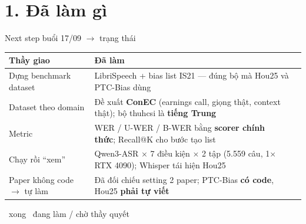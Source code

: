 \documentclass[aspectratio=169,xcolor=table]{beamer}
\newcommand{\hi}[1]{\textcolor{Primary}{\textbf{#1}}}
\newcommand{\bad}[1]{\textcolor{RiskRed}{\textbf{#1}}}
\newcommand{\cmark}{\textcolor{GoodGreen}{\ding{51}}}
\newcommand{\pmark}{\textcolor{Accent!85!black}{\ding{108}}}
\begin{document}
\section{1. Đã làm gì}
\begin{frame}{Next step buổi 17/09 $\rightarrow$ trạng thái}
\small\renewcommand{\arraystretch}{1.3}
\begin{tabular}{@{}p{3.6cm}p{8.6cm}c@{}}
\toprule
\textbf{Thầy giao} & \textbf{Đã làm} & \\
\midrule
Dựng benchmark dataset & LibriSpeech + bias list IS21 --- đúng bộ mà Hou25 và PTC-Bias dùng & \cmark\\
Dataset theo domain & Đề xuất \hi{ConEC} (earnings call, giọng thật, context thật); bộ thuhcsi là \bad{tiếng Trung} & \pmark\\
Metric & WER / U-WER / B-WER bằng \textbf{scorer chính thức}; Recall@K cho bước tạo list & \cmark\\
Chạy rồi ``xem'' & Qwen3-ASR $\times$ 7 điều kiện $\times$ 2 tập (5.559 câu, 1$\times$RTX 4090); Whisper tái hiện Hou25 & \cmark\\
Paper không code $\rightarrow$ tự làm & Đã đối chiếu setting 2 paper; PTC-Bias \textbf{có code}, Hou25 \textbf{phải tự viết} & \pmark\\
\bottomrule
\end{tabular}
\vfill
{\footnotesize\cmark\ xong \quad \pmark\ đang làm / chờ thầy quyết}
\end{frame}
\end{document}
